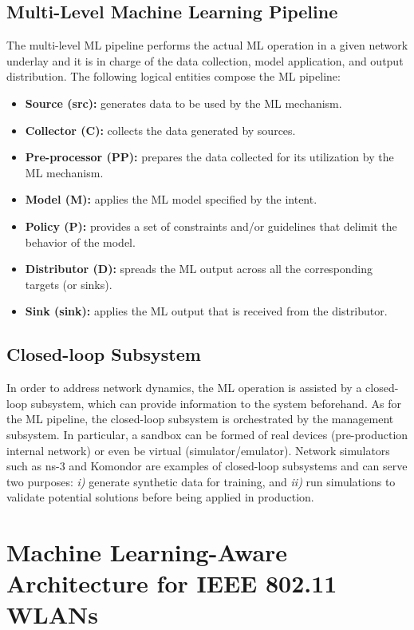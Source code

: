 \documentclass{article}
\begin{document}
\subsection{Multi-Level Machine Learning Pipeline} 
The multi-level ML pipeline performs the actual ML operation in a given network underlay and it is in charge of the data collection, model application, and output distribution. The following logical entities compose the ML pipeline:
\begin{itemize}
	\item \textbf{Source (src):} generates data to be used by the ML mechanism.
	\item \textbf{Collector (C):} collects the data generated by sources.
	\item \textbf{Pre-processor (PP):} prepares the data collected for its utilization by the ML mechanism.
	\item \textbf{Model (M):} applies the ML model specified by the intent.
	\item \textbf{Policy (P):} provides a set of constraints and/or guidelines that delimit the behavior of the model.
	\item \textbf{Distributor (D):} spreads the ML output across all the corresponding targets (or sinks).
	\item \textbf{Sink (sink):} applies the ML output that is received from the distributor.
\end{itemize}

\subsection{Closed-loop Subsystem} 
In order to address network dynamics, the ML operation is assisted by a closed-loop subsystem, which can provide information to the system beforehand. As for the ML pipeline, the closed-loop subsystem is orchestrated by the management subsystem. In particular, a sandbox can be formed of real devices (pre-production internal network) or even be virtual (simulator/emulator). Network simulators such as ns-3 and Komondor \cite{barrachina2019komondor} are examples of closed-loop subsystems and can serve two purposes: \emph{i)} generate synthetic data for training, and \emph{ii)} run simulations to validate potential solutions before being applied in production.

\section{Machine Learning-Aware Architecture for IEEE 802.11 WLANs}
\label{section:wlans_architecture}
\end{document}
